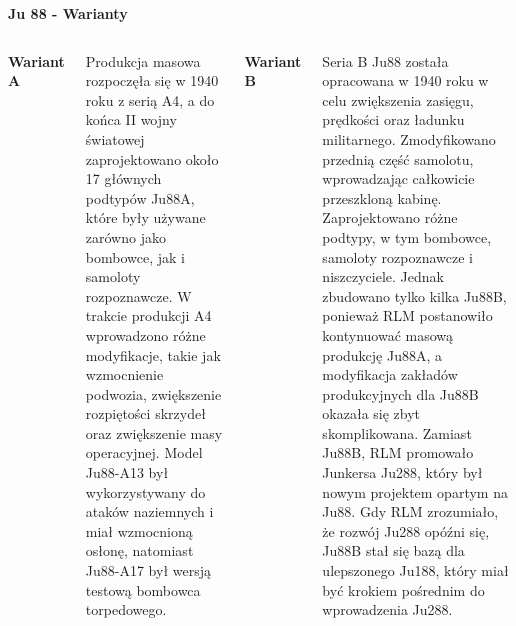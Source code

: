 \begin{frame}[t]{\Huge{\textbf{Ju 88 - Warianty}}}
	\begin{columns}[t]

{\large{\textbf{Wariant A}}}	\\~\
	\justifying

Produkcja masowa rozpoczęła się w 1940 roku z serią A4, a do końca II wojny światowej zaprojektowano około 17 głównych podtypów Ju88A, które były używane zarówno jako bombowce, jak i samoloty rozpoznawcze. W trakcie produkcji A4 wprowadzono różne modyfikacje, takie jak wzmocnienie podwozia, zwiększenie rozpiętości skrzydeł oraz zwiększenie masy operacyjnej. Model Ju88-A13 był wykorzystywany do ataków naziemnych i miał wzmocnioną osłonę, natomiast Ju88-A17 był wersją testową bombowca torpedowego.

		
{\large{\textbf{Wariant B}}}	\\~\
	\justifying

Seria B Ju88 została opracowana w 1940 roku w celu zwiększenia zasięgu, prędkości oraz ładunku militarnego. Zmodyfikowano przednią część samolotu, wprowadzając całkowicie przeszkloną kabinę. Zaprojektowano różne podtypy, w tym bombowce, samoloty rozpoznawcze i niszczyciele. Jednak zbudowano tylko kilka Ju88B, ponieważ RLM postanowiło kontynuować masową produkcję Ju88A, a modyfikacja zakładów produkcyjnych dla Ju88B okazała się zbyt skomplikowana. Zamiast Ju88B, RLM promowało Junkersa Ju288, który był nowym projektem opartym na Ju88. Gdy RLM zrozumiało, że rozwój Ju288 opóźni się, Ju88B stał się bazą dla ulepszonego Ju188, który miał być krokiem pośrednim do wprowadzenia Ju288.

	\end{columns}
\end{frame}


